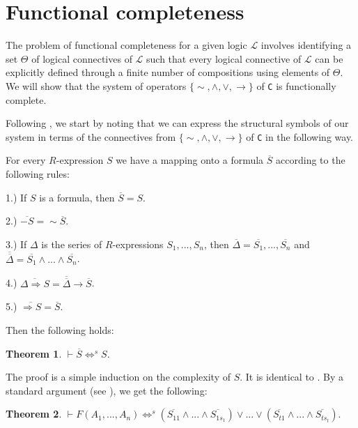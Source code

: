 \documentclass{article}%
\theoremstyle{break}
\newtheorem{theorem}{Theorem}[section]
\begin{document}
\section{Functional completeness}
The problem of functional completeness for a given logic $\mathcal{L}$ involves identifying a set $\Theta$ of logical connectives of $\mathcal{L}$ such that every logical connective of $\mathcal{L}$ can be explicitly defined through a finite number of compositions using elements of $\Theta$.
We will show that the system of operators $\{{\sim}, \wedge, \vee, \rightarrow\}$ of \texttt{C} is functionally complete.

Following \cite{Kutschera1969}, we start by noting that we can express the structural symbols of our system in terms of the connectives from $\{{\sim}, \wedge, \vee, \rightarrow\}$ of \texttt{C} in the following way.

\noindent For every $R$-expression $S$ we have a mapping onto a formula $\overline{S}$ according to the following rules:

1.) If $S$ is a formula, then $\overline{S}=S$.

2.) $\overline{-S}={\sim}\overline{S}$.

3.) If $\Delta$ is the series of $R$-expressions $S_1,..., S_n$, then $\overline{\Delta}=\overline{S_1},..., \overline{S_n}$ and $\overline{\overline{\Delta}}=\overline{S_1}\wedge...\wedge \overline{S_n}$.

4.) $\overline{\Delta \Rightarrow S}=\overline{\overline{\Delta}}\rightarrow \overline{S}$.

5.) $\overline{\Rightarrow S}=\overline{S}$.

Then the following holds:


\begin{theorem}\label{substitution4} 
$\vdash\overline{S} \Leftrightarrow^{s} S$.
\end{theorem}

\noindent The proof is a simple induction on the complexity of $S$. It is identical to \cite[p. 109f.]{Kutschera1969}. By a standard argument (see \cite[p. 110]{Kutschera1969}), we get the following:


\begin{theorem}\label{substitution5}
 $\vdash F(A_1,...,A_n) \Leftrightarrow^{s} (\overline{S_{1 1}} \wedge... \wedge \overline{S_{1 s_{1}}}) \vee...\vee(\overline{S_{t 1}} \wedge...\wedge \overline{S_{t s_{t}}}).$
\end{theorem}
\end{document}
